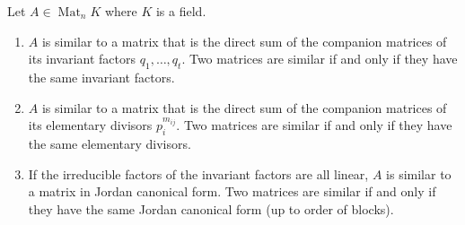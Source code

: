 Let $A \in \operatorname{Mat}_n K$ where $K$ is a field.
\begin{enumerate}
\item $A$ is similar to a matrix that is the direct sum of the companion matrices of its invariant factors $q_1, \ldots, q_t$. Two matrices are similar if and only if they have the same invariant factors.
\item $A$ is similar to a matrix that is the direct sum of the companion matrices of its elementary divisors $p_i^{m_{ij}}$. Two matrices are similar if and only if they have the same elementary divisors.
\item If the irreducible factors of the invariant factors are all linear, $A$ is similar to a matrix in Jordan canonical form. Two matrices are similar if and only if they have the same Jordan canonical form (up to order of blocks).
\end{enumerate}
